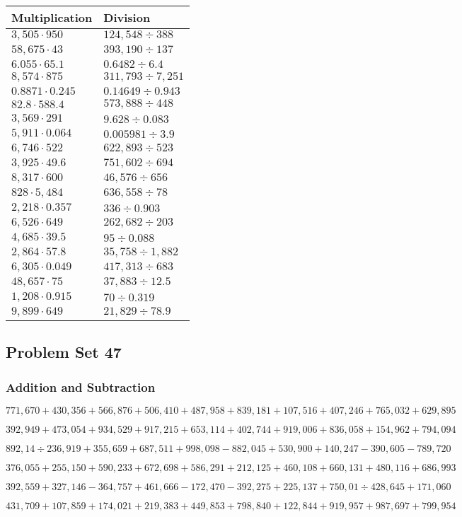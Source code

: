 \begin{longtable}[]{@{}ll@{}}
\toprule
Multiplication & Division\tabularnewline
\midrule
\endhead
\(3,505\cdot950\) & \(124,548÷388\)\tabularnewline
\(58,675\cdot43\) & \(393,190÷137\)\tabularnewline
\(6.055\cdot65.1\) & \(0.6482÷6.4\)\tabularnewline
\(8,574\cdot875\) & \(311,793÷7,251\)\tabularnewline
\(0.8871\cdot0.245\) & \(0.14649÷0.943\)\tabularnewline
\(82.8\cdot588.4\) & \(573,888÷448\)\tabularnewline
\(3,569\cdot291\) & \(9.628÷0.083\)\tabularnewline
\(5,911\cdot0.064\) & \(0.005981÷3.9\)\tabularnewline
\(6,746\cdot522\) & \(622,893÷523\)\tabularnewline
\(3,925\cdot49.6\) & \(751,602÷694\)\tabularnewline
\(8,317\cdot600\) & \(46,576÷656\)\tabularnewline
\(828\cdot5,484\) & \(636,558÷78\)\tabularnewline
\(2,218\cdot0.357\) & \(336÷0.903\)\tabularnewline
\(6,526\cdot649\) & \(262,682÷203\)\tabularnewline
\(4,685\cdot39.5\) & \(95÷0.088\)\tabularnewline
\(2,864\cdot57.8\) & \(35,758÷1,882\)\tabularnewline
\(6,305\cdot0.049\) & \(417,313÷683\)\tabularnewline
\(48,657\cdot75\) & \(37,883÷12.5\)\tabularnewline
\(1,208\cdot0.915\) & \(70÷0.319\)\tabularnewline
\(9,899\cdot649\) & \(21,829÷78.9\)\tabularnewline
\bottomrule
\end{longtable}

\hypertarget{problem-set-47-4}{%
\subsection{Problem Set 47}\label{problem-set-47-4}}

\hypertarget{addition-and-subtraction-352}{%
\subsubsection{Addition and
Subtraction}\label{addition-and-subtraction-352}}

\(771,670+430,356+566,876+506,410+487,958+839,181+107,516+407,246+765,032+ 629,895\)

\(392,949+473,054+934,529+917,215+653,114+402,744+919,006+836,058+154,962+794,094\)

\(892,14÷236,919+355,659+687,511+998,098-882,045+530,900+140,247-390,605-789,720\)

\(376,055+255,150+590,233+672,698+586,291+212,125+460,108+660,131+480,116+686,993\)

\(392,559+327,146-364,757+461,666-172,470-392,275+225,137+750,01÷428,645+171,060\)

\(431,709+107,859+174,021+219,383+449,853+798,840+122,844+919,957+987,697+799,954\)

